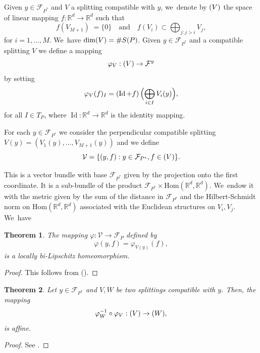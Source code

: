 \documentclass[10pt]{amsart}
\newcommand{\quand}{\quad\text{and}\quad}
\newcommand{\NoChangel}[1]{%
\expandafter\let\csname old\string#1\endcsname=#1
\let#1=\relax
\newcommand{#1}{\mathop{\mathcode`l="716C\csname old\string#1\endcsname\mathcode`l="7160}\displaylimits}%
}
\newtheorem{theorem}{Theorem}[section]
\newcommand{\R}{\mathbb{R}}
\newcommand{\F}{\mathcal{F}}
\newcommand{\V}{\mathcal{V}}
\DeclareMathOperator{\id}{Id}
\DeclareMathOperator{\nil}{Nil}\NoChangel{\nil}
\begin{document}
Given \(y \in \F_{P^\ast} \) and \(V\) a splitting compatible with \(y\), we~denote by \(\nil (V)\) the space of linear mapping \(f:\R^d \to \R^d\) such that\vspace*{-3pt}
\begin{equation}\label{defineVequation}
f\left(V_{M+1}\right) \;= \{0\} \quand f\left(V_i\right) \subset \bigoplus_{j : j>i } V_j,
\end{equation}
for \(i = 1,\ldots,M\). We~have \(\dim \nil(V) = \# S(P)\). Given \(y\in \F_{P^\ast} \) and a compatible splitting \(V\) we define a mapping\vspace*{-3pt}
\[
\varphi_V: \nil(V) \to \F^{y}
\]
by setting\vspace*{-3pt}
\begin{equation}\label{lineartoconfiguration}
\varphi_{V}(f)_I = \left(\id + f\right)\Bigl(\bigoplus_{i \in I}V_i(y)\Bigr),
\end{equation}
for all \(I \in T_P\), where \(\id:\R^d \to \R^d\) is the identity mapping.

For each \(y \in \F_{P^\ast} \) we consider the perpendicular compatible splitting \(V(y) = (V_1(y),\ldots, V_{M+1}(y))\) and we define
\begin{equation}\label{vectorbundleequation}
\V = \lbrace (y,f): y \in \F_{P^\ast}, f \in \nil(V)\rbrace.
\end{equation}

This is a vector bundle with base \(\F_{P^\ast} \) given by the projection onto the first coordinate. It is a sub-bundle of the product \(\F_{P^\ast} \times \text{Hom}(\R^d,\R^d)\). We~endow it with the metric given by the sum of the distance in \(\F_{P^\ast} \) and the Hilbert-Schmidt norm on \(\text{Hom}(\R^d,\R^d)\) associated with the Euclidean structures on \(V_i, V_j\). We~have

\begin{theorem}\label{fiberbundle}The mapping \(\varphi :\V \to \F_{P} \) defined by
\[
\varphi (y,f) = \varphi_{V(y)}(f),
\]
is a locally bi-Lipschitz homeomorphism. \end{theorem}
\begin{proof}This follows from \cite[Th.\,2.4 \& its proof]{LL23} (\cite[\S4]{LL23}). \end{proof}

\begin{theorem}\label{changeofsplitting} Let \(y\in \F_{P^\ast} \) and \(V,W\) be two splittings compatible with \(y\). Then, the mapping
\[
\varphi_W^{-1}\circ \varphi_{V}:\nil(V) \to \nil (W),
\]
is affine.
\end{theorem}
\begin{proof} See \cite[Lem.\,5.8]{LL23}.
\end{proof}
\end{document}
